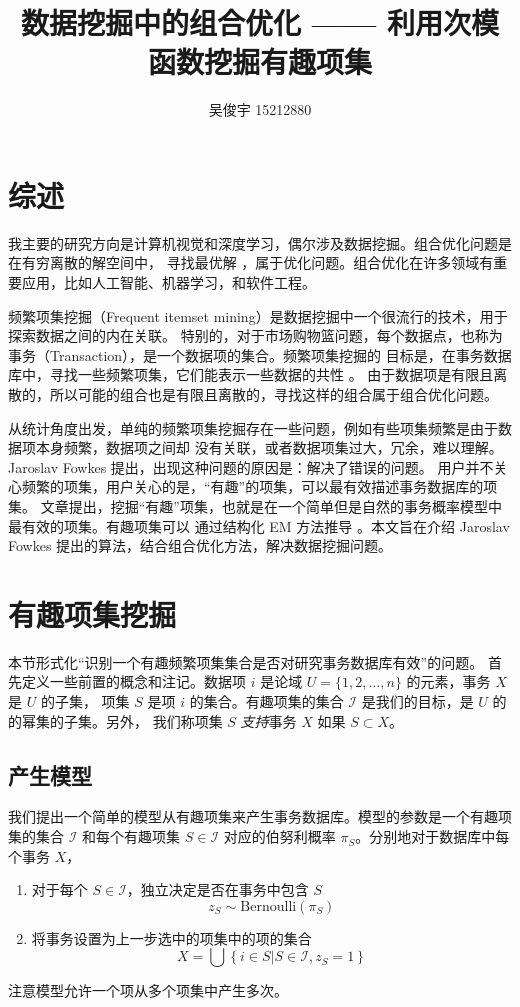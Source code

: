 \documentclass{ctexart}
\title{数据挖掘中的组合优化 —— 利用次模函数挖掘有趣项集}
\author{吴俊宇 15212880}
\newcommand{\scri}[0]{\mathcal{I}}
\begin{document}
\date{}
\maketitle
\tableofcontents
\pagebreak

\section{综述}

我主要的研究方向是计算机视觉和深度学习，偶尔涉及数据挖掘。组合优化问题是在有穷离散的解空间中，
寻找最优解 \cite{cop-wiki}，属于优化问题。组合优化在许多领域有重要应用，比如人工智能、机器学习，和软件工程。

频繁项集挖掘（Frequent itemset mining）是数据挖掘中一个很流行的技术，用于探索数据之间的内在关联。
特别的，对于市场购物篮问题，每个数据点，也称为事务（Transaction），是一个数据项的集合。频繁项集挖掘的
目标是，在事务数据库中，寻找一些频繁项集，它们能表示一些数据的共性 \cite{hjw-book}。
由于数据项是有限且离散的，所以可能的组合也是有限且离散的，寻找这样的组合属于组合优化问题。

从统计角度出发，单纯的频繁项集挖掘存在一些问题，例如有些项集频繁是由于数据项本身频繁，数据项之间却
没有关联，或者数据项集过大，冗余，难以理解。Jaroslav Fowkes 提出，出现这种问题的原因是：解决了错误的问题。
用户并不关心频繁的项集，用户关心的是，“有趣”的项集，可以最有效描述事务数据库的项集\cite{this-paper}。
文章提出，挖掘“有趣”项集，也就是在一个简单但是自然的事务概率模型中最有效的项集。有趣项集可以
通过结构化 EM 方法推导 \cite{em-book}。本文旨在介绍 Jaroslav Fowkes 提出的算法，结合组合优化方法，解决数据挖掘问题。

\section{有趣项集挖掘}

本节形式化“识别一个有趣频繁项集集合是否对研究事务数据库有效”的问题。
首先定义一些前置的概念和注记。数据项 $i$ 是论域 $U = \{1, 2, \dots, n\}$ 的元素，事务 $X$ 是 $U$ 的子集，
项集 $S$ 是项 $i$ 的集合。有趣项集的集合 $\mathcal I$ 是我们的目标，是 $U$ 的的幂集的子集。另外，
我们称项集 $S$ \textit{支持}事务 $X$ 如果 $S \subset X$。

\subsection{产生模型}

我们提出一个简单的模型从有趣项集来产生事务数据库。模型的参数是一个有趣项集的集合 $\scri$ 和每个有趣项集
$S \in \scri$ 对应的伯努利概率 $\pi_S$。分别地对于数据库中每个事务 $X$，
\begin{enumerate}
	\item 对于每个 $S \in \scri$，独立决定是否在事务中包含 $S$
	$$
	z_S \sim \mathrm{Bernoulli}(\pi_S)
	$$
	\item 将事务设置为上一步选中的项集中的项的集合
	$$
	X = \bigcup \left\{ i \in S | S \in \scri, z_S = 1 \right\}
	$$
\end{enumerate}
注意模型允许一个项从多个项集中产生多次。
\end{document}
